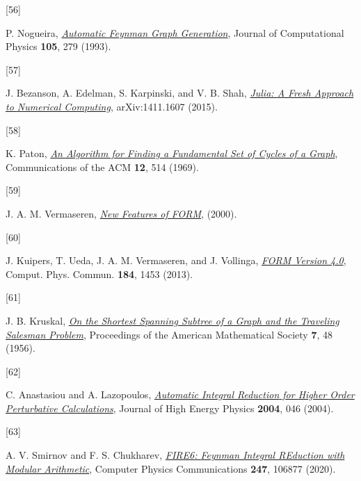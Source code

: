 \documentclass[
  11pt,
  a4paper,
  DIV=11,
  numbers=noendperiod,
  twoside]{scrreprt}
\newlength{\cslhangindent}
\newlength{\csllabelwidth}
\newlength{\cslentryspacingunit} %
\newenvironment{CSLReferences}[2] %
 {%
  \setlength{\parindent}{0pt}
  \ifodd #1
  \let\oldpar\par
  \def\par{\hangindent=\cslhangindent\oldpar}
  \fi
  \setlength{\parskip}{#2\cslentryspacingunit}
 }%
 {}
\newcommand{\CSLLeftMargin}[1]{\parbox[t]{\csllabelwidth}{#1}}
\newcommand{\CSLRightInline}[1]{\parbox[t]{\linewidth - \csllabelwidth}{#1}\break}
\DeclareRobustCommand{\[}{\begin{equation}}
\DeclareRobustCommand{\]}{\end{equation}}
\begin{document}
\begin{CSLReferences}{0}{0}
\leavevmode{}%
\CSLLeftMargin{{[}56{]} }%
\CSLRightInline{P. Nogueira,
\emph{\href{https://doi.org/10.1006/jcph.1993.1074}{Automatic {Feynman
Graph Generation}}}, Journal of Computational Physics \textbf{105}, 279
(1993).}

\leavevmode{}%
\CSLLeftMargin{{[}57{]} }%
\CSLRightInline{J. Bezanson, A. Edelman, S. Karpinski, and V. B. Shah,
\emph{\href{https://arxiv.org/abs/1411.1607}{Julia: {A Fresh Approach}
to {Numerical Computing}}}, arXiv:1411.1607 (2015).}

\leavevmode{}%
\CSLLeftMargin{{[}58{]} }%
\CSLRightInline{K. Paton,
\emph{\href{https://doi.org/10.1145/363219.363232}{An Algorithm for
Finding a Fundamental Set of Cycles of a Graph}}, Communications of the
ACM \textbf{12}, 514 (1969).}

\leavevmode{}%
\CSLLeftMargin{{[}59{]} }%
\CSLRightInline{J. A. M. Vermaseren,
\emph{\href{https://arxiv.org/abs/math-ph/0010025}{New Features of
{FORM}}}, (2000).}

\leavevmode{}%
\CSLLeftMargin{{[}60{]} }%
\CSLRightInline{J. Kuipers, T. Ueda, J. A. M. Vermaseren, and J.
Vollinga, \emph{\href{https://doi.org/10.1016/j.cpc.2012.12.028}{{FORM}
Version 4.0}}, Comput. Phys. Commun. \textbf{184}, 1453 (2013).}

\leavevmode{}%
\CSLLeftMargin{{[}61{]} }%
\CSLRightInline{J. B. Kruskal,
\emph{\href{https://doi.org/10.1090/S0002-9939-1956-0078686-7}{On the
Shortest Spanning Subtree of a Graph and the Traveling Salesman
Problem}}, Proceedings of the American Mathematical Society \textbf{7},
48 (1956).}

\leavevmode{}%
\CSLLeftMargin{{[}62{]} }%
\CSLRightInline{C. Anastasiou and A. Lazopoulos,
\emph{\href{https://doi.org/10.1088/1126-6708/2004/07/046}{Automatic
{Integral Reduction} for {Higher Order Perturbative Calculations}}},
Journal of High Energy Physics \textbf{2004}, 046 (2004).}

\leavevmode{}%
\CSLLeftMargin{{[}63{]} }%
\CSLRightInline{A. V. Smirnov and F. S. Chukharev,
\emph{\href{https://doi.org/10.1016/j.cpc.2019.106877}{{FIRE6}: {Feynman
Integral REduction} with {Modular Arithmetic}}}, Computer Physics
Communications \textbf{247}, 106877 (2020).}


\end{CSLReferences}
\end{document}
